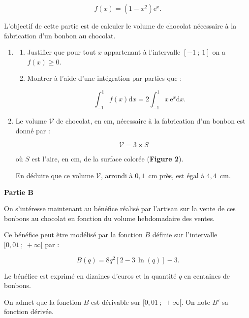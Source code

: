 \documentclass[10pt]{article}
\providecommand{\e}{{\mathrm{e}}}
\begin{document}
\[f(x) = \left(1 - x^2\right)\e^x.\]

L'objectif de cette partie est de calculer le volume de chocolat nécessaire à la fabrication d'un bonbon au chocolat.

\begin{enumerate}
\item 
	\begin{enumerate}
		\item Justifier que pour tout $x$ appartenant à l'intervalle $[-1~;~1]$ on a $f(x) \geqslant 0$.
		\item Montrer à l'aide d'une intégration par parties que :
		
\[ \int_{-1}^1 f(x) \text{d}x = 2 \int_{-1}^1 x\,\e^{x} \text{d}x. \]

	\end{enumerate}
\item Le volume $\mathcal{V}$ de chocolat, en cm, nécessaire à la fabrication d'un bonbon est donné par :

\[ \mathcal{V} = 3 \times S \]

où $S$ est l'aire, en cm, de la surface colorée (\textbf{Figure 2}).

En déduire que ce volume $\mathcal{V}$, arrondi à $0,1$~cm près, est égal à $4,4$~cm.
\end{enumerate}

\bigskip

\begin{center}
\textbf{Partie B}
\end{center}

On s'intéresse maintenant au bénéfice réalisé par l'artisan sur la vente de ces bonbons au chocolat en fonction du volume hebdomadaire des ventes.

\smallskip

Ce bénéfice peut être modélisé par la fonction $B$ définie sur l'intervalle $[0,01~;~+\infty[$ par : 

\[B(q) = 8q^2 [2 -3\,\ln(q)] - 3.\]

Le bénéfice est exprimé en dizaines d'euros et la quantité $q$ en centaines de bonbons.

\medskip

On admet que la fonction $B$ est dérivable sur $[0,01~;~+\infty[$. On note $B'$ sa fonction dérivée. 
\end{document}
